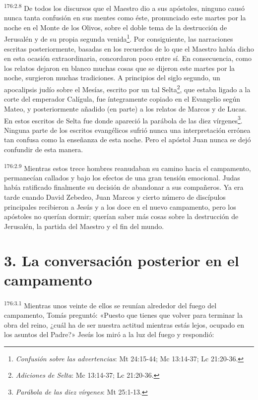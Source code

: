 \par
\textsuperscript{176:2.8} De todos los discursos que el Maestro dio a sus apóstoles, ninguno causó nunca tanta confusión en sus mentes como éste, pronunciado este martes por la noche en el Monte de los Olivos, sobre el doble tema de la destrucción de Jerusalén y de su propia segunda venida\footnote{\textit{Confusión sobre las advertencias}: Mt 24:15-44; Mc 13:14-37; Lc 21:20-36.}. Por consiguiente, las narraciones escritas posteriormente, basadas en los recuerdos de lo que el Maestro había dicho en esta ocasión extraordinaria, concordaron poco entre sí. En consecuencia, como los relatos dejaron en blanco muchas cosas que se dijeron este martes por la noche, surgieron muchas tradiciones. A principios del siglo segundo, un apocalipsis judío sobre el Mesías, escrito por un tal Selta\footnote{\textit{Adiciones de Selta}: Mc 13:14-37; Lc 21:20-36.}, que estaba ligado a la corte del emperador Calígula, fue íntegramente copiado en el Evangelio según Mateo, y posteriormente añadido (en parte) a los relatos de Marcos y de Lucas. En estos escritos de Selta fue donde apareció la parábola de las diez vírgenes\footnote{\textit{Parábola de las diez vírgenes}: Mt 25:1-13.}. Ninguna parte de los escritos evangélicos sufrió nunca una interpretación errónea tan confusa como la enseñanza de esta noche. Pero el apóstol Juan nunca se dejó confundir de esta manera.

\par
\textsuperscript{176:2.9} Mientras estos trece hombres reanudaban su camino hacia el campamento, permanecían callados y bajo los efectos de una gran tensión emocional. Judas había ratificado finalmente su decisión de abandonar a sus compañeros. Ya era tarde cuando David Zebedeo, Juan Marcos y cierto número de discípulos principales recibieron a Jesús y a los doce en el nuevo campamento, pero los apóstoles no querían dormir; querían saber más cosas sobre la destrucción de Jerusalén, la partida del Maestro y el fin del mundo.

\section*{3. La conversación posterior en el campamento}
\par
\textsuperscript{176:3.1} Mientras unos veinte de ellos se reunían alrededor del fuego del campamento, Tomás preguntó: «Puesto que tienes que volver para terminar la obra del reino, ¿cuál ha de ser nuestra actitud mientras estás lejos, ocupado en los asuntos del Padre?» Jesús los miró a la luz del fuego y respondió:

